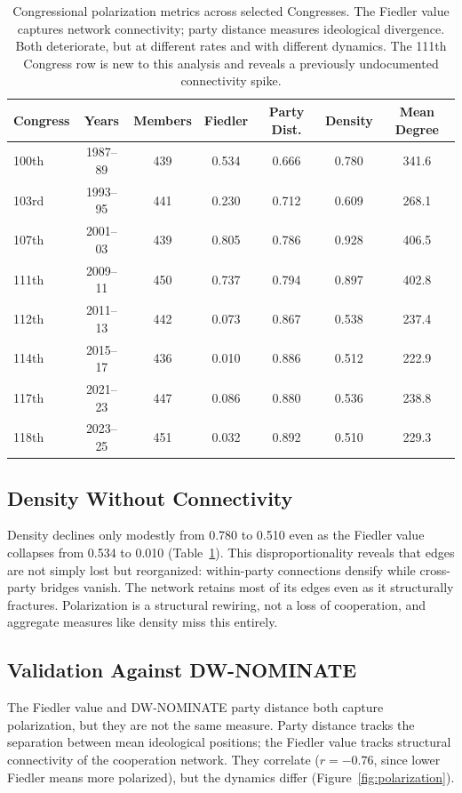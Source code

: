 \documentclass[12pt, a4paper]{article}
\begin{document}
\begin{table}[H]
\centering
\caption{Congressional polarization metrics across selected Congresses. The Fiedler value captures network connectivity; party distance measures ideological divergence. Both deteriorate, but at different rates and with different dynamics. The 111th Congress row is new to this analysis and reveals a previously undocumented connectivity spike.}
\label{tab:polarization}
\begin{tabular}{lcccccc}
\toprule
Congress & Years & Members & Fiedler & Party Dist. & Density & Mean Degree \\
\midrule
100th & 1987--89 & 439 & 0.534 & 0.666 & 0.780 & 341.6 \\
103rd & 1993--95 & 441 & 0.230 & 0.712 & 0.609 & 268.1 \\
107th & 2001--03 & 439 & 0.805 & 0.786 & 0.928 & 406.5 \\
111th & 2009--11 & 450 & 0.737 & 0.794 & 0.897 & 402.8 \\
112th & 2011--13 & 442 & 0.073 & 0.867 & 0.538 & 237.4 \\
114th & 2015--17 & 436 & 0.010 & 0.886 & 0.512 & 222.9 \\
117th & 2021--23 & 447 & 0.086 & 0.880 & 0.536 & 238.8 \\
118th & 2023--25 & 451 & 0.032 & 0.892 & 0.510 & 229.3 \\
\bottomrule
\end{tabular}
\end{table}

\subsection{Density Without Connectivity}

Density declines only modestly from 0.780 to 0.510 even as the Fiedler value collapses from 0.534 to 0.010 (Table~\ref{tab:polarization}). This disproportionality reveals that edges are not simply lost but reorganized: within-party connections densify while cross-party bridges vanish. The network retains most of its edges even as it structurally fractures. Polarization is a structural rewiring, not a loss of cooperation, and aggregate measures like density miss this entirely.

\subsection{Validation Against DW-NOMINATE}

The Fiedler value and DW-NOMINATE party distance both capture polarization, but they are not the same measure. Party distance tracks the separation between mean ideological positions; the Fiedler value tracks structural connectivity of the cooperation network. They correlate ($r = -0.76$, since lower Fiedler means more polarized), but the dynamics differ (Figure~\ref{fig:polarization}).
\end{document}
